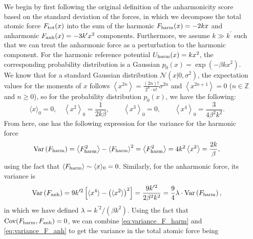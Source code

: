 We begin by first following the original definition of the anharmonicity score based on the standard deviation of the forces, in which we decompose the total atomic force $F_{\mbox{\scriptsize{tot}}}(x)$ into the sum of the harmonic $F_{\mbox{\scriptsize{harm}}}(x)=-2kx$ and anharmonic $F_{\mbox{\scriptsize{anh}}}(x)=-3k^{\prime}x^2$ components. Furthermore, we assume  $k\gg k^{\prime}$ such that we can treat the anharmonic force as a perturbation to the harmonic component. For the harmonic reference potential $U_{\mbox{\scriptsize{harm}}}(x)=kx^2$, the corresponding probability distribution is a Gaussian $p_0 (x)=\exp\left(-\beta kx^2\right)$. We know that for a standard Gaussian distribution $\mathcal{N}(x|0,\sigma^2)$, the expectation values for the moments of $x$ follows $\left\langle x^{2n}\right\rangle=\frac{(2n)!}{2^n\cdot n!}\sigma^{2n}$ and $\left\langle x^{2n+1}\right\rangle=0$ ($n\in\mathbb{Z}$ and $n\geq 0$), so for the probability distribution $p_0(x)$, we have the following:
\begin{equation*}
    \langle x\rangle_0=0,\quad \left\langle x^2\right\rangle_0=\frac{1}{2k\beta},\qquad \left\langle x^3\right\rangle_0=0,\qquad\left\langle x^4\right\rangle_0=\frac{3}{4\beta^2k^2}.
\end{equation*}
From here, one has the following expression for the variance for the harmonic force
\begin{equation} 
\label{eq:variance_F_harm}
\mbox{Var}\left(F_{\mbox{\scriptsize{harm}}}\right)=\left\langle F_{\mbox{\scriptsize{harm}}}^2\right\rangle-\left\langle F_{\mbox{\scriptsize{harm}}}\right\rangle^2=\left\langle F_{\mbox{\scriptsize{harm}}}^2\right\rangle=4k^2\left\langle x^2\right\rangle=\frac{2k}{\beta},
\end{equation}
using the fact that $\left\langle F_{\mbox{\scriptsize{harm}}}\right\rangle\sim\langle x\rangle_0=0$. Similarly, for the anharmonic force, its variance is 
\begin{equation}
    \label{eq:variance_F_anh}
    \mbox{Var}\left(F_{\mbox{\scriptsize{anh}}}\right)=9k^{\prime 2}\left[\langle x^4\rangle-\left(\langle x^2\rangle\right)^2\right]=\frac{9k^{\prime 2}}{2\beta^2k^2}=\frac{9}{4}\lambda\cdot\mbox{Var}\left(F_{\mbox{\scriptsize{harm}}}\right),
\end{equation}
in which we have defined $\lambda=k^{\prime 2}/(\beta k^2)$. Using the fact that $\mbox{Cov}(F_{\mbox{\scriptsize{harm}}},F_{\mbox{\scriptsize{anh}}})=0$, we can combine \cref{eq:variance_F_harm} and \cref{eq:variance_F_anh} to get the variance in the total atomic force being
